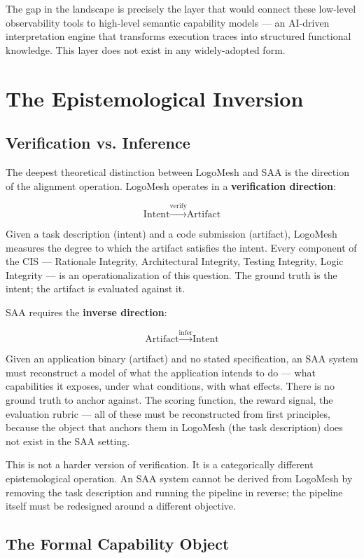 \documentclass[11pt, a4paper]{article}
\begin{document}
The gap in the landscape is precisely the layer that would connect these low-level observability tools to high-level semantic capability models — an AI-driven interpretation engine that transforms execution traces into structured functional knowledge. This layer does not exist in any widely-adopted form.

\section{The Epistemological Inversion}

\subsection{Verification vs. Inference}

The deepest theoretical distinction between LogoMesh and SAA is the direction of the alignment operation. LogoMesh operates in a \textbf{verification direction}:

\[
\text{Intent} \xrightarrow{\text{verify}} \text{Artifact}
\]

Given a task description (intent) and a code submission (artifact), LogoMesh measures the degree to which the artifact satisfies the intent. Every component of the CIS — Rationale Integrity, Architectural Integrity, Testing Integrity, Logic Integrity — is an operationalization of this question. The ground truth is the intent; the artifact is evaluated against it.

SAA requires the \textbf{inverse direction}:

\[
\text{Artifact} \xrightarrow{\text{infer}} \text{Intent}
\]

Given an application binary (artifact) and no stated specification, an SAA system must reconstruct a model of what the application intends to do — what capabilities it exposes, under what conditions, with what effects. There is no ground truth to anchor against. The scoring function, the reward signal, the evaluation rubric — all of these must be reconstructed from first principles, because the object that anchors them in LogoMesh (the task description) does not exist in the SAA setting.

This is not a harder version of verification. It is a categorically different epistemological operation. An SAA system cannot be derived from LogoMesh by removing the task description and running the pipeline in reverse; the pipeline itself must be redesigned around a different objective.

\subsection{The Formal Capability Object}
\end{document}
